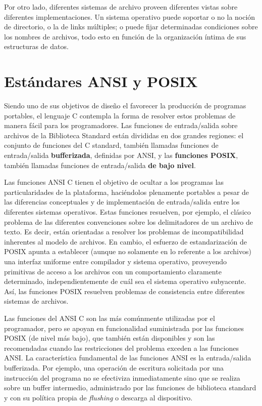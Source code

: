 Por otro lado, diferentes sistemas de archivo proveen diferentes vistas sobre
diferentes implementaciones. Un sistema operativo puede soportar o no la noción
de directorio, o la de links múltiples; o puede fijar determinadas condiciones
sobre los nombres de archivos, todo esto en función de la organización íntima
de sus estructuras de datos.

\section{Estándares ANSI y POSIX}
Siendo uno de sus objetivos de diseño el favorecer la producción de
programas portables, el lenguaje C contempla la forma de resolver estos problemas de
manera fácil para los programadores. Las funciones de entrada/salida sobre
archivos de la Biblioteca Standard están divididas en dos grandes regiones: el
conjunto de funciones del C standard, también llamadas funciones de 
entrada/salida \textbf{bufferizada}, definidas por ANSI, y las 
\textbf{funciones POSIX}, también llamadas
funciones de entrada/salida \textbf{de bajo nivel}.

Las funciones ANSI C tienen el objetivo de ocultar a los programas las
particularidades de la plataforma, haciéndolos plenamente portables a pesar de
las diferencias conceptuales y de implementación de entrada/salida entre los
diferentes sistemas operativos. Estas funciones resuelven, por ejemplo, el
clásico problema de las diferentes convenciones sobre los delimitadores de un
archivo de texto. Es decir, están orientadas a resolver los problemas de
incompatibilidad inherentes al modelo de archivos. En cambio, el esfuerzo de
estandarización de POSIX apunta a establecer (aunque no solamente en lo
referente a los archivos) una interfaz uniforme entre compilador y sistema
operativo, proveyendo primitivas de acceso a los archivos con un comportamiento
claramente determinado, independientemente de cuál sea el sistema operativo
subyacente. Así, las funciones POSIX resuelven problemas de consistencia entre
diferentes sistemas de archivos.

Las funciones del ANSI C son las más comúnmente utilizadas por el programador,
pero se apoyan en funcionalidad suministrada por las funciones POSIX (de nivel
más bajo), que también están disponibles y son las recomendadas cuando las
restricciones del problema exceden a las funciones ANSI. La característica
fundamental de las funciones ANSI es la entrada/salida bufferizada. Por
ejemplo, una operación de escritura solicitada por una instrucción del programa
no se efectiviza inmediatamente sino que se realiza sobre un buffer intermedio,
administrado por las funciones de biblioteca standard y con su política propia
de \textit{flushing} o descarga al dispositivo. 

